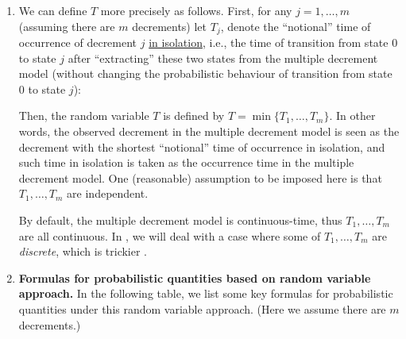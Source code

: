 \begin{enumerate}
\item \label{it:isolate-decr} We can define \(T\) more precisely as follows.
First, for any \(j=1,\dotsc,m\) (assuming there are \(m\) decrements) let
\(T_j\), denote the ``notional'' time of occurrence of decrement \(j\)
\underline{in isolation}, i.e., the time of transition from state \(0\) to
state \(j\) after ``extracting'' these two states from the multiple decrement
model (without changing the probabilistic behaviour of transition from state
\(0\) to state \(j\)):
\begin{center}
\end{center}
Then, the random variable \(T\) is defined by \(T=\min\{T_1,\dotsc,T_m\}\). In
other words, the observed decrement in the multiple decrement model is seen as
the decrement with the shortest ``notional'' time of occurrence in isolation,
and such time in isolation is taken as the occurrence time in the multiple
decrement model. One (reasonable) assumption to be imposed here is that
\(T_1,\dotsc,T_m\) are independent.

By default, the multiple decrement model is continuous-time, thus
\(T_1,\dotsc,T_m\) are all continuous. In , we
will deal with a case where some of \(T_1,\dotsc,T_m\) are \emph{discrete},
which is trickier \warn{}.

\item \label{it:rv-mult-decr-prob-fmlas} \textbf{Formulas for probabilistic
quantities based on random variable approach.}
In the following table, we list some key formulas for probabilistic quantities
under this random variable approach. (Here we assume there are \(m\) decrements.)


\end{enumerate}

